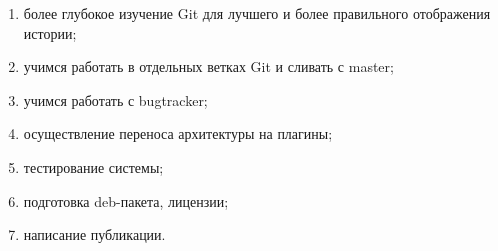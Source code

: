 \begin{enumerate}
\item более глубокое изучение Git для лучшего и более правильного отображения истории; 
\item учимся работать в отдельных ветках Git и сливать с master;
\item учимся работать с bugtracker;
\item осуществление переноса архитектуры на плагины;
\item тестирование системы;
\item подготовка deb-пакета, лицензии;
\item написание публикации.
\end{enumerate}

